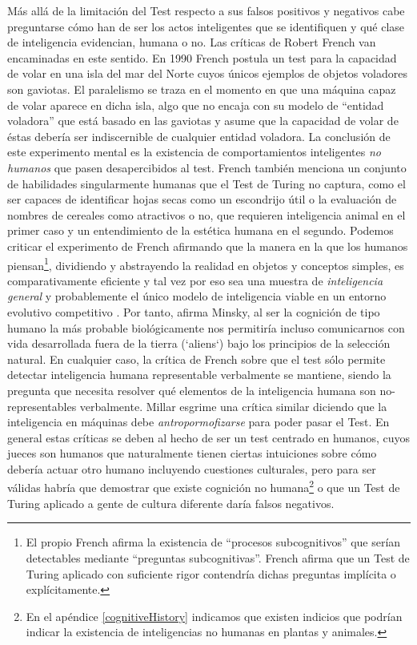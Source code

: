 \documentclass[12pt]{memoir}
\begin{document}
Más allá de la limitación del Test respecto a sus falsos positivos y negativos cabe preguntarse cómo han de ser los actos inteligentes que se identifiquen y qué clase de inteligencia evidencian, humana o no. Las críticas de Robert French van encaminadas en este sentido. En 1990 \parencite[apartado 4.5]{afterTuring} French postula un test para la capacidad de volar en una isla del mar del Norte cuyos únicos ejemplos de objetos voladores son gaviotas. El paralelismo se traza en el momento en que una máquina capaz de volar aparece en dicha isla, algo que no encaja con su modelo de ``entidad voladora'' que está basado en las gaviotas y asume que la capacidad de volar de éstas debería ser indiscernible de cualquier entidad voladora. La conclusión de este experimento mental es la existencia de comportamientos inteligentes \textit{no humanos} que pasen desapercibidos al test. French también menciona un conjunto de habilidades singularmente humanas que el Test de Turing no captura, como el ser capaces de identificar hojas secas como un escondrijo útil o la evaluación de nombres de cereales como atractivos o no, que requieren inteligencia animal en el primer caso y un entendimiento de la estética humana en el segundo. Podemos criticar el experimento de French afirmando que la manera en la que los humanos piensan\footnote{El propio French afirma la existencia de ``procesos subcognitivos'' que serían detectables mediante ``preguntas subcognitivas''. French afirma que un Test de Turing aplicado con suficiente rigor contendría dichas preguntas implícita o explícitamente.}, dividiendo y abstrayendo la realidad en objetos y conceptos simples, es comparativamente eficiente y tal vez por eso sea una muestra de \textit{inteligencia general} y probablemente el único modelo de inteligencia viable en un entorno evolutivo competitivo \parencite{aliens}. Por tanto, afirma Minsky, al ser la cognición de tipo humano la más probable biológicamente nos permitiría incluso comunicarnos con vida desarrollada fuera de la tierra (`aliens`) bajo los principios de la selección natural. En cualquier caso, la crítica de French sobre que el test sólo permite detectar inteligencia humana representable verbalmente se mantiene, siendo la pregunta que necesita resolver qué elementos de la inteligencia humana son no-representables verbalmente.  Millar esgrime una crítica similar \parencite[apartado 3.3]{afterTuring} diciendo que la inteligencia en máquinas debe \textit{antropormofizarse} para poder pasar el Test. En general estas críticas se deben al hecho de ser un test centrado en humanos, cuyos jueces son humanos que naturalmente tienen ciertas intuiciones sobre cómo debería actuar otro humano incluyendo cuestiones culturales, pero para ser válidas habría que demostrar que existe cognición no humana\footnote{En el apéndice \ref{cognitiveHistory} indicamos que existen indicios que podrían indicar la existencia de inteligencias no humanas en plantas y animales.} o que un Test de Turing aplicado a gente de cultura diferente daría falsos negativos. 
\end{document}
